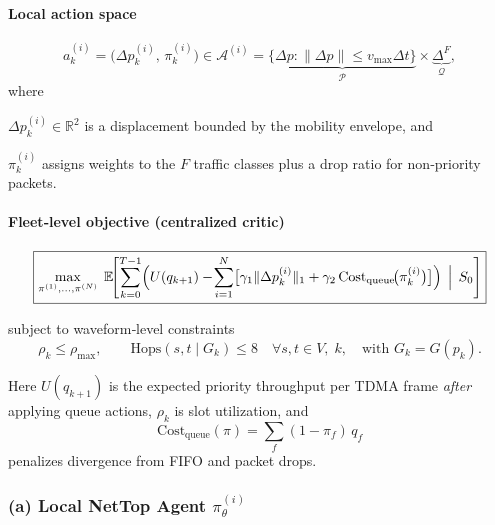 \documentclass[doc.tex]{subfiles}
\begin{document}
\vspace{0.4em}
\paragraph{Local action space}

\[
a_k^{(i)}=\bigl(\Delta p_k^{(i)},\,\pi_k^{(i)}\bigr)
  \in\mathcal{A}^{(i)}
  =\underbrace{\{\Delta p:\|\Delta p\|\le v_{\max}\Delta t\}}_{\mathcal{P}}
   \times
   \underbrace{\Delta^{F}}_{\mathcal{Q}},
\]
where
\begin{enumerate*}[label=(\roman*)]
  \item $\Delta p_k^{(i)}\in\mathbb{R}^2$ is a displacement bounded by the mobility envelope, and
  \item $\pi_k^{(i)}$ assigns weights to the $F$ traffic classes plus a drop ratio for non‑priority packets.
\end{enumerate*}

\vspace{0.4em}
\paragraph{Fleet‑level objective (centralized critic)}

\begin{equation}
\label{eq:dec_pomdp_objective}
\boxed{
\max_{\pi^{(1)},\dots,\pi^{(N)}}\;
\mathbb{E}\!\Biggl[
   \sum_{k=0}^{T-1}
     \Bigl(
       U(q_{k+1})
       -\!\sum_{i=1}^N
          \bigl[
            \gamma_1\lVert\Delta p_k^{(i)}\rVert_1
            +\gamma_2\,\mathrm{Cost}_{\text{queue}}\!\bigl(\pi_k^{(i)}\bigr)
          \bigr]
     \Bigr)
   \,\Bigm|\,S_0\Biggr]
}
\end{equation}

subject to waveform‑level constraints
\[
  \rho_k\le\rho_{\max},
  \qquad
  \mathrm{Hops}(s,t\!\mid\!G_k)\le 8
  \quad\forall s,t\!\in\!V,\;k,
  \quad\text{with }G_k=G(p_k).
\]

Here \(U(q_{k+1})\) is the expected priority throughput per TDMA frame \emph{after} applying queue actions, \(\rho_k\) is slot utilization, and
\[
\mathrm{Cost}_{\text{queue}}(\pi)=\sum_{f}(1-\pi_f)\,q_f
\]
penalizes divergence from FIFO and packet drops.

\subsubsection*{(a) Local NetTop Agent \(\pi^{(i)}_{\theta}\)}
\end{document}

